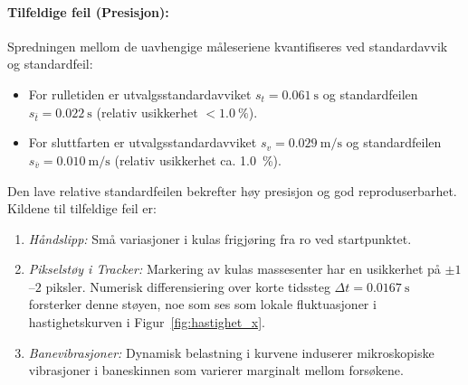 \documentclass[11pt,a4paper]{article}
\begin{document}
\paragraph{Tilfeldige feil (Presisjon):}
Spredningen mellom de uavhengige måleseriene kvantifiseres ved standardavvik og standardfeil:
\begin{itemize}
    \item For rulletiden er utvalgsstandardavviket $s_t = \SI{0,061}{\second}$ og standardfeilen $s_{\bar{t}} = \SI{0,022}{\second}$ (relativ usikkerhet $< \SI{1,0}{\percent}$).
    \item For sluttfarten er utvalgsstandardavviket $s_v = \SI{0,029}{\meter\per\second}$ og standardfeilen $s_{\bar{v}} = \SI{0,010}{\meter\per\second}$ (relativ usikkerhet ca. \SI{1,0}{\percent}).
\end{itemize}
Den lave relative standardfeilen bekrefter høy presisjon og god reproduserbarhet. Kildene til tilfeldige feil er:
\begin{enumerate}
    \item \emph{Håndslipp:} Små variasjoner i kulas frigjøring fra ro ved startpunktet.
    \item \emph{Pikselstøy i Tracker:} Markering av kulas massesenter har en usikkerhet på $\pm 1$--$2$ piksler. Numerisk differensiering over korte tidssteg $\Delta t = \SI{0,0167}{\second}$ forsterker denne støyen, noe som ses som lokale fluktuasjoner i hastighetskurven i Figur~\ref{fig:hastighet_x}.
    \item \emph{Banevibrasjoner:} Dynamisk belastning i kurvene induserer mikroskopiske vibrasjoner i baneskinnen som varierer marginalt mellom forsøkene.
\end{enumerate}
\end{document}
